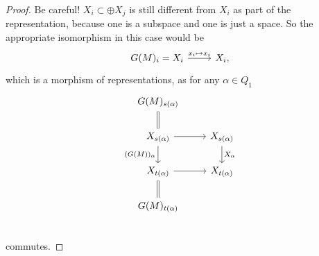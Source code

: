 \begin{proof}
  \coms Be careful! $X_i\subset \oplus X_j$ is still different from $X_i$ as part of the representation, because one is a subspace and one is just a space. So the appropriate isomorphism in this case would be
  \[
  \begin{tikzcd}
    G(M)_i = X_i \ar{r}{x_i\mapsto x_i} &X_i,
  \end{tikzcd}
  \]
  which is a morphism of representations, as for any $\alpha \in Q_1$
  \[
  \begin{tikzcd}
    G(M)_{s(\alpha)} \ar[equal]{d}&\\
    X_{s(\alpha)}\ar{r}\ar[swap]{d}{(G(M))_{\alpha}}&X_{s(\alpha)}\ar{d}{X_{\alpha}}\\
    X_{t(\alpha)}\ar{r}&X_{t(\alpha)}\\
    G(M)_{t(\alpha)} \ar[equal]{u}& \\
  \end{tikzcd}
  \]
  commutes.

\end{proof}
\come

